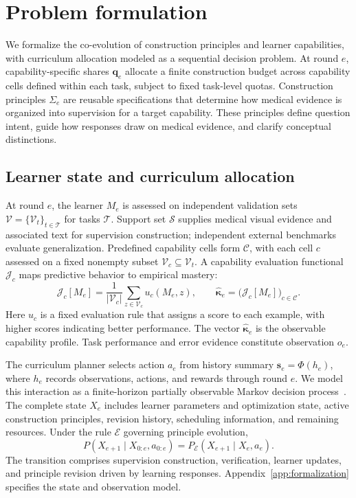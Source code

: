 \section{Problem formulation}
\label{sec:problem}

We formalize the co-evolution of construction principles and learner capabilities, with curriculum allocation modeled as a sequential decision problem. At round $e$, capability-specific shares $\boldsymbol q_e$ allocate a finite construction budget across capability cells defined within each task, subject to fixed task-level quotas. Construction principles $\Sigma_e$ are reusable specifications that determine how medical evidence is organized into supervision for a target capability. These principles define question intent, guide how responses draw on medical evidence, and clarify conceptual distinctions.

\subsection{Learner state and curriculum allocation}

At round $e$, the learner $M_e$ is assessed on independent validation sets $\mathcal V=\{\mathcal V_t\}_{t\in\mathcal T}$ for tasks $\mathcal T$. Support set $\mathcal S$ supplies medical visual evidence and associated text for supervision construction; independent external benchmarks evaluate generalization. Predefined capability cells form $\mathcal C$, with each cell $c$ assessed on a fixed nonempty subset $\mathcal V_c\subseteq\mathcal V_t$. A capability evaluation functional $\mathcal J_c$ maps predictive behavior to empirical mastery:
\begin{equation}
\mathcal J_c[M_e]=\frac{1}{|\mathcal V_c|}\sum_{z\in\mathcal V_c}u_c(M_e,z),
\qquad
\widehat{\boldsymbol\kappa}_e=\bigl(\mathcal J_c[M_e]\bigr)_{c\in\mathcal C}.
\label{eq:capability_level}
\end{equation}
Here $u_c$ is a fixed evaluation rule that assigns a score to each example, with higher scores indicating better performance. The vector $\widehat{\boldsymbol\kappa}_e$ is the observable capability profile. Task performance and error evidence constitute observation $o_e$.

The curriculum planner selects action $a_e$ from history summary $\mathbf{s}_e=\Phi(h_e)$, where $h_e$ records observations, actions, and rewards through round $e$. We model this interaction as a finite-horizon partially observable Markov decision process~\citep{kaelbling1998planning,matiisen2017teacher}. The complete state $X_e$ includes learner parameters and optimization state, active construction principles, revision history, scheduling information, and remaining resources. Under the rule $\mathscr E$ governing principle evolution,
\begin{equation}
P(X_{e+1}\mid X_{0:e},a_{0:e})
=P_{\mathscr E}(X_{e+1}\mid X_e,a_e).
\label{eq:transition}
\end{equation}
The transition comprises supervision construction, verification, learner updates, and principle revision driven by learning responses. Appendix~\ref{app:formalization} specifies the state and observation model.

